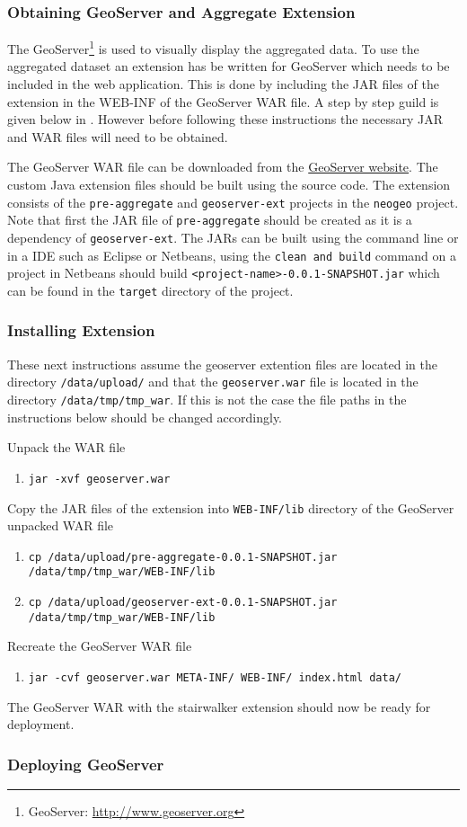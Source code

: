 \subsubsection{Obtaining GeoServer and Aggregate Extension}
The GeoServer\footnote{GeoServer: \url{http://www.geoserver.org}} is used to visually display the aggregated data. To use the aggregated dataset an extension has be written for GeoServer which needs to be included in the web application. This is done by including the JAR files of the extension in the WEB-INF of the GeoServer WAR file. A step by step guild is given below in . However before following these instructions the necessary JAR and WAR files will need to be obtained.

The GeoServer WAR file can be downloaded from the \href{http://www.geoserver.org/download/}{GeoServer website}. The custom Java extension files should be built using the source code. The extension consists of the \lstinline|pre-aggregate| and \lstinline|geoserver-ext| projects in the \lstinline|neogeo| project. Note that first the JAR file of \lstinline|pre-aggregate| should be created as it is a dependency of \lstinline|geoserver-ext|. The JARs can be built using the command line or in a IDE such as Eclipse or Netbeans, using the \lstinline|clean and build| command on a project in Netbeans should build \lstinline|<project-name>-0.0.1-SNAPSHOT.jar| which can be found in the \lstinline|target| directory of the project.

\subsubsection{Installing Extension}
\label{sec:InstallExtension}
\noindent These next instructions assume the geoserver extention files are located in the directory \lstinline|/data/upload/| and that the \lstinline|geoserver.war| file is located in the directory \mbox{\lstinline|/data/tmp/tmp_war|}. If this is not the case the file paths in the instructions below should be changed accordingly. \newline

\noindent Unpack the WAR file
\begin{enumerate}
	\item \lstinline|jar -xvf geoserver.war|
\end{enumerate}
Copy the JAR files of the extension into \lstinline|WEB-INF/lib| directory of the GeoServer unpacked WAR file
\begin{enumerate}[resume]
	\item \lstinline|cp /data/upload/pre-aggregate-0.0.1-SNAPSHOT.jar /data/tmp/tmp_war/WEB-INF/lib|
	\item \lstinline|cp /data/upload/geoserver-ext-0.0.1-SNAPSHOT.jar /data/tmp/tmp_war/WEB-INF/lib|
\end{enumerate}
Recreate the GeoServer WAR file
\begin{enumerate}[resume]
	\item \lstinline|jar -cvf geoserver.war META-INF/ WEB-INF/ index.html data/|
\end{enumerate}
The GeoServer WAR with the stairwalker extension should now be ready for deployment.

\subsubsection{Deploying GeoServer}
